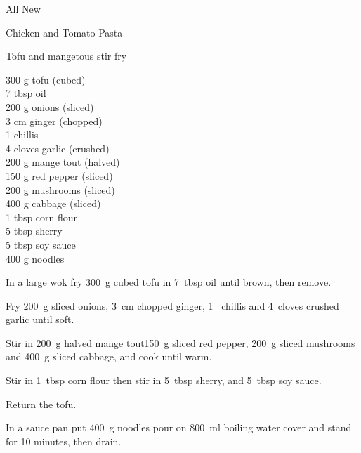 \begin{menu}{All New}
\begin{recipe}{2}{Chicken and Tomato Pasta}
\begin{instructions}
    \end{instructions}
    \end{recipe}%
  
    \begin{recipe}{2}{Tofu and mangetous stir fry}%
    
		\begin{ingredients}
		300 g tofu (cubed) \\
	7 tbsp oil  \\
	200 g onions (sliced) \\
	3 cm ginger (chopped) \\
	1  chillis  \\
	4 cloves garlic (crushed) \\
	200 g mange tout (halved) \\
	150 g red pepper (sliced) \\
	200 g mushrooms (sliced) \\
	400 g cabbage (sliced) \\
	1 tbsp corn flour  \\
	5 tbsp sherry  \\
	5 tbsp soy sauce  \\
	400 g noodles  \\
	
		\end{ingredients}
	
	
    \begin{instructions}
    \item 
        In a large wok fry
        300~g cubed tofu
        in
        7~tbsp  oil
        until brown, then remove.
      \item 
        Fry 200~g sliced onions,        
        3~cm chopped ginger,
        1~  chillis
        and
        4~cloves crushed garlic
        until soft.
      \item 
        Stir in
        200~g halved mange tout150~g sliced red pepper,
        200~g sliced mushrooms
        and
        400~g sliced cabbage,
        and cook until warm.
      \item 
        Stir in 1~tbsp  corn flour
        then stir in
        5~tbsp  sherry,
        and
        5~tbsp  soy sauce.
      \item 
        Return the tofu.
      \item 
      In a sauce pan
      put
      400~g  noodles
      pour on
      800~ml  boiling water
      cover and stand for 10 minutes, then drain.
    

\end{instructions}
\end{recipe}
\end{menu}
